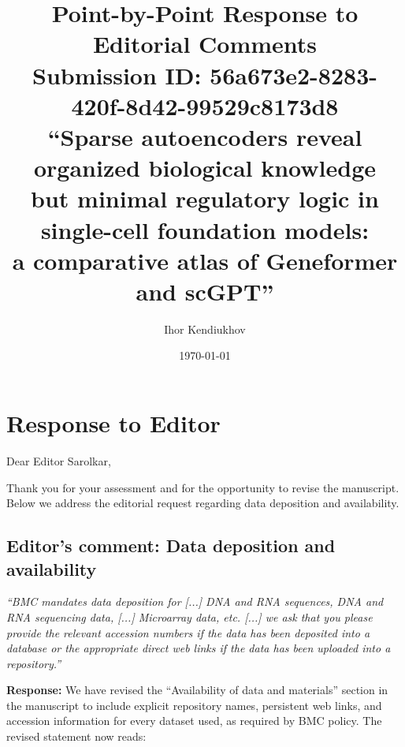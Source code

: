 \documentclass[11pt]{article}
\title{Point-by-Point Response to Editorial Comments\\[6pt]
\large Submission ID: 56a673e2-8283-420f-8d42-99529c8173d8\\[4pt]
\large ``Sparse autoencoders reveal organized biological knowledge\\but minimal regulatory logic in single-cell foundation models:\\a comparative atlas of Geneformer and scGPT''}
\author{Ihor Kendiukhov}
\date{\today}
\begin{document}
\maketitle

\section*{Response to Editor}

Dear Editor Sarolkar,

Thank you for your assessment and for the opportunity to revise the manuscript. Below we address the editorial request regarding data deposition and availability.

\subsection*{Editor's comment: Data deposition and availability}

\textit{``BMC mandates data deposition for [...] DNA and RNA sequences, DNA and RNA sequencing data, [...] Microarray data, etc. [...] we ask that you please provide the relevant accession numbers if the data has been deposited into a database or the appropriate direct web links if the data has been uploaded into a repository.''}

\textbf{Response:} We have revised the ``Availability of data and materials'' section in the manuscript to include explicit repository names, persistent web links, and accession information for every dataset used, as required by BMC policy. The revised statement now reads:
\end{document}
